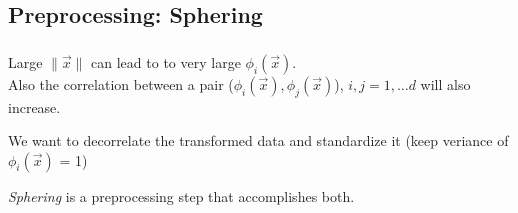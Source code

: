 \subsection{Preprocessing: Sphering}

\begin{frame}\frametitle{\subsecname}

Large $\lVert \vec x \rVert$ can lead to to very large $\phi_i(\vec x)$. \\
Also the correlation between a pair ($\phi_i(\vec x), \phi_j(\vec x)$), $i,j=1,\ldots d$ will also increase.

We want to decorrelate the transformed data and standardize it (keep veriance of $\phi_i(\vec x)$ = 1)

\emph{Sphering} is a preprocessing step that accomplishes both.

\end{frame}
